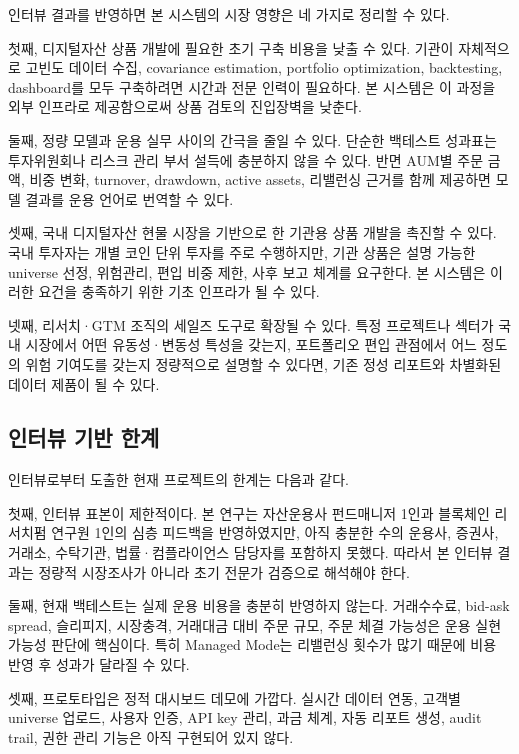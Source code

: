 \documentclass[12pt,a4paper]{article}
\begin{document}
인터뷰 결과를 반영하면 본 시스템의 시장 영향은 네 가지로 정리할 수 있다.

첫째, 디지털자산 상품 개발에 필요한 초기 구축 비용을 낮출 수 있다. 기관이 자체적으로 고빈도 데이터 수집, covariance estimation, portfolio optimization, backtesting, dashboard를 모두 구축하려면 시간과 전문 인력이 필요하다. 본 시스템은 이 과정을 외부 인프라로 제공함으로써 상품 검토의 진입장벽을 낮춘다.

둘째, 정량 모델과 운용 실무 사이의 간극을 줄일 수 있다. 단순한 백테스트 성과표는 투자위원회나 리스크 관리 부서 설득에 충분하지 않을 수 있다. 반면 AUM별 주문 금액, 비중 변화, turnover, drawdown, active assets, 리밸런싱 근거를 함께 제공하면 모델 결과를 운용 언어로 번역할 수 있다.

셋째, 국내 디지털자산 현물 시장을 기반으로 한 기관용 상품 개발을 촉진할 수 있다. 국내 투자자는 개별 코인 단위 투자를 주로 수행하지만, 기관 상품은 설명 가능한 universe 선정, 위험관리, 편입 비중 제한, 사후 보고 체계를 요구한다. 본 시스템은 이러한 요건을 충족하기 위한 기초 인프라가 될 수 있다.

넷째, 리서치·GTM 조직의 세일즈 도구로 확장될 수 있다. 특정 프로젝트나 섹터가 국내 시장에서 어떤 유동성·변동성 특성을 갖는지, 포트폴리오 편입 관점에서 어느 정도의 위험 기여도를 갖는지 정량적으로 설명할 수 있다면, 기존 정성 리포트와 차별화된 데이터 제품이 될 수 있다.

\subsection{인터뷰 기반 한계}

인터뷰로부터 도출한 현재 프로젝트의 한계는 다음과 같다.

첫째, 인터뷰 표본이 제한적이다. 본 연구는 자산운용사 펀드매니저 1인과 블록체인 리서치펌 연구원 1인의 심층 피드백을 반영하였지만, 아직 충분한 수의 운용사, 증권사, 거래소, 수탁기관, 법률·컴플라이언스 담당자를 포함하지 못했다. 따라서 본 인터뷰 결과는 정량적 시장조사가 아니라 초기 전문가 검증으로 해석해야 한다.

둘째, 현재 백테스트는 실제 운용 비용을 충분히 반영하지 않는다. 거래수수료, bid-ask spread, 슬리피지, 시장충격, 거래대금 대비 주문 규모, 주문 체결 가능성은 운용 실현가능성 판단에 핵심이다. 특히 Managed Mode는 리밸런싱 횟수가 많기 때문에 비용 반영 후 성과가 달라질 수 있다.

셋째, 프로토타입은 정적 대시보드 데모에 가깝다. 실시간 데이터 연동, 고객별 universe 업로드, 사용자 인증, API key 관리, 과금 체계, 자동 리포트 생성, audit trail, 권한 관리 기능은 아직 구현되어 있지 않다.
\end{document}
